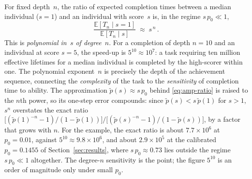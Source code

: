 \documentclass{article}
\begin{document}
For fixed depth~$n$, the ratio of expected completion times between a
median individual ($s = 1$) and an individual with score~$s$ is, in the
regime $s\,p_0 \ll 1$,
\begin{equation}\label{eq:amp-ratio}
  \frac{\mathbb{E}[T_n \mid s=1]}{\mathbb{E}[T_n \mid s]}
  \;\approx\;
  s^{\,n}\,.
\end{equation}
This is \emph{polynomial in~$s$ of degree~$n$}. For a completion of
depth $n = 10$ and an individual at score $s = 5$, the speed-up is
$5^{10} \approx 10^7$: a task requiring ten million effective lifetimes for
a median individual is completed by the high-scorer within one. The
polynomial exponent~$n$ is precisely the depth of the achievement
sequence, connecting the \emph{complexity} of the task to the \emph{sensitivity} of completion time to ability. The approximation $\widetilde{p}(s) \approx s\,p_0$ behind \eqref{eq:amp-ratio} is raised to the $n$th power, so its one-step error compounds: since $\widetilde{p}(s) < s\,\widetilde{p}(1)$ for $s > 1$, $s^{n}$ overstates the exact ratio $\big[(\widetilde{p}(1)^{-n} - 1)/(1 - \widetilde{p}(1))\big] \big/ \big[(\widetilde{p}(s)^{-n} - 1)/(1 - \widetilde{p}(s))\big]$, by a factor that grows with $n$. For the example, the exact ratio is about $7.7 \times 10^{6}$ at $p_0 = 0.01$, against $5^{10} \approx 9.8 \times 10^{6}$, and about $2.9 \times 10^{5}$ at the calibrated $p_0 = 0.1455$ of Section~\ref{sec:results}, where $s\,p_0 \approx 0.73$ lies outside the regime $s\,p_0 \ll 1$ altogether. The degree-$n$ sensitivity is the point; the figure $5^{10}$ is an order of magnitude only under small $p_0$.
\end{document}
